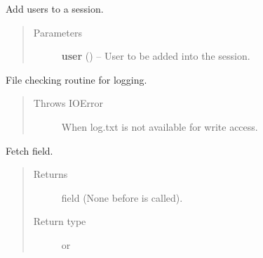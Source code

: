 \documentclass[letterpaper,10pt,english]{sphinxmanual}
\begin{document}
\begin{fulllineitems}
\begin{quote}
\begin{description}
\end{description}\end{quote}

\begin{fulllineitems}
\label{api:models.Session.addUser}
Add users to a session.
\begin{quote}\begin{description}
\item[{Parameters}] \leavevmode
\textbf{user} ({\hyperref[api:models.User]{}}) -- User to be added into the session.

\end{description}\end{quote}

\end{fulllineitems}


\begin{fulllineitems}
\label{api:models.Session.fileRoutine}
File checking routine for logging.
\begin{quote}\begin{description}
\item[{Throws IOError}] \leavevmode
When log.txt is not available for write access.

\end{description}\end{quote}

\end{fulllineitems}


\begin{fulllineitems}
\label{api:models.Session.get_last_checked}
Fetch  field.
\begin{quote}\begin{description}
\item[{Returns}] \leavevmode
{} field (None before {\hyperref[api:models.Session.start]{}} is called).

\item[{Return type}] \leavevmode
{} or 

\end{description}\end{quote}


\end{fulllineitems}
\end{fulllineitems}
\end{document}
